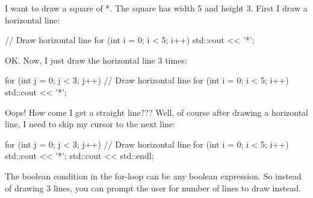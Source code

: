 I want to draw a square of *. The square has width 5 and height 3. First
I draw a horizontal line:
\begin{console}
// Draw horizontal line
for (int i = 0; i < 5; i++)
{   
    std::cout << '*';
}
\end{console}

OK. Now, I just draw the horizontal line 3 times:
\begin{console}
for (int j = 0; j < 3; j++)
{   
    // Draw horizontal line
    for (int i = 0; i < 5; i++)
    {   
        std::cout << '*';
    }
}
\end{console}

Oops! How come I get a straight line??? Well, of course after drawing a
horizontal line, I need to skip my cursor to the next line:
\begin{console}
for (int j = 0; j < 3; j++)
{   
    // Draw horizontal line
    for (int i = 0; i < 5; i++)
    {   
        std::cout << '*';
    }
    std::cout << std::endl;
}
\end{console}


The boolean condition in the for-loop can be any boolean expression. So
instead of drawing 3 lines, you can prompt the user for number of lines
to draw instead.



\newpage{}

